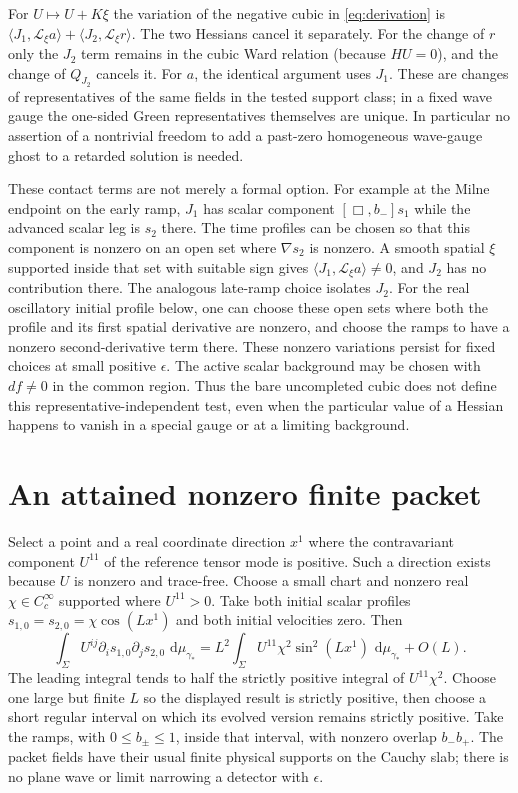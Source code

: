 \documentclass[11pt]{article}
\newcommand{\dd}{\,\mathrm d}
\newcommand{\Lie}{\mathcal L}
\numberwithin{equation}{section}
\begin{document}
For \(U\mapsto U+K\xi\) the variation of the negative
cubic in \eqref{eq:derivation} is
\(\langle J_1,\Lie_\xi a\rangle+\langle J_2,\Lie_\xi r\rangle\).
The two Hessians cancel it separately.
For the change of \(r\) only the \(J_2\) term remains in
the cubic Ward relation (because \(HU=0\)), and the
change of \(Q_{J_2}\) cancels it. For \(a\), the identical
argument uses \(J_1\). These are changes of representatives
of the same fields in the tested support class; in a fixed
wave gauge the one-sided Green representatives themselves
are unique. In particular no assertion of a nontrivial
freedom to add a past-zero homogeneous wave-gauge ghost
to a retarded solution is needed.

These contact terms are not merely a formal option.
For example at the Milne endpoint on the early ramp,
\(J_1\) has scalar component \([\Box,b_-]s_1\)
while the advanced scalar leg is \(s_2\) there.
The time profiles can be chosen so that this component
is nonzero on an open set where \(\nabla s_2\) is
nonzero. A smooth spatial \(\xi\) supported inside
that set with suitable sign gives
\(\langle J_1,\Lie_\xi a\rangle\ne0\), and \(J_2\)
has no contribution there. The analogous late-ramp
choice isolates \(J_2\). For the real oscillatory initial
profile below, one can choose these open sets where
both the profile and its first spatial derivative are
nonzero, and choose the ramps to have a nonzero
second-derivative term there. These nonzero variations
persist for fixed choices at small positive \(\epsilon\).
The active scalar background may be chosen with
\(df\ne0\) in the common region. Thus the bare
uncompleted cubic does not define this representative-independent
test, even when the particular value of a Hessian
happens to vanish in a special gauge or at a limiting
background.

\section{An attained nonzero finite packet}

Select a point and a real coordinate direction \(x^1\)
where the contravariant component \(U^{11}\) of the
reference tensor mode is positive. Such a direction
exists because \(U\) is nonzero and trace-free.
Choose a small chart and nonzero real
\(\chi\in C_c^\infty\) supported where \(U^{11}>0\).
Take both initial scalar profiles
\(s_{1,0}=s_{2,0}=\chi\cos(Lx^1)\) and both
initial velocities zero. Then
\[
 \int_{\Sigma} U^{ij}\partial_i s_{1,0}
                 \partial_j s_{2,0}\,\dd\mu_{\gamma_*}
 =
 L^2\int_{\Sigma} U^{11}\chi^2\sin^2(Lx^1)
                 \,\dd\mu_{\gamma_*}+O(L).
\]
The leading integral tends to half the strictly positive
integral of \(U^{11}\chi^2\). Choose one large but finite
\(L\) so the displayed result is strictly positive,
then choose a short regular interval on which its evolved
version remains strictly positive. Take the ramps, with
\(0\le b_\pm\le1\), inside that interval, with nonzero
overlap \(b_-b_+\). The packet fields have their usual
finite physical supports on the Cauchy slab;
there is no plane wave or limit narrowing a detector
with \(\epsilon\).
\end{document}

